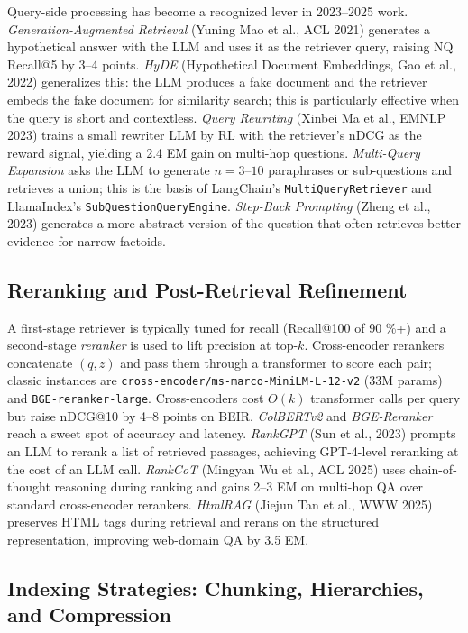 Query-side processing has become a recognized lever in 2023--2025 work. \emph{Generation-Augmented Retrieval} (Yuning Mao et al., ACL 2021) generates a hypothetical answer with the LLM and uses it as the retriever query, raising NQ Recall@5 by 3--4 points. \emph{HyDE} (Hypothetical Document Embeddings, Gao et al., 2022) generalizes this: the LLM produces a fake document and the retriever embeds the fake document for similarity search; this is particularly effective when the query is short and contextless. \emph{Query Rewriting} (Xinbei Ma et al., EMNLP 2023) trains a small rewriter LLM by RL with the retriever's nDCG as the reward signal, yielding a 2.4 EM gain on multi-hop questions. \emph{Multi-Query Expansion} asks the LLM to generate \(n=3\)--\(10\) paraphrases or sub-questions and retrieves a union; this is the basis of LangChain's \texttt{MultiQueryRetriever} and LlamaIndex's \texttt{SubQuestionQueryEngine}. \emph{Step-Back Prompting} (Zheng et al., 2023) generates a more abstract version of the question that often retrieves better evidence for narrow factoids.

\subsection{Reranking and Post-Retrieval Refinement}\label{reranking-and-post-retrieval-refinement}

A first-stage retriever is typically tuned for recall (Recall@100 of 90 \%+) and a second-stage \emph{reranker} is used to lift precision at top-\(k\). Cross-encoder rerankers concatenate \((q, z)\) and pass them through a transformer to score each pair; classic instances are \texttt{cross-encoder/ms-marco-MiniLM-L-12-v2} (33M params) and \texttt{BGE-reranker-large}. Cross-encoders cost \(O(k)\) transformer calls per query but raise nDCG@10 by 4--8 points on BEIR. \emph{ColBERTv2} and \emph{BGE-Reranker} reach a sweet spot of accuracy and latency. \emph{RankGPT} (Sun et al., 2023) prompts an LLM to rerank a list of retrieved passages, achieving GPT-4-level reranking at the cost of an LLM call. \emph{RankCoT} (Mingyan Wu et al., ACL 2025) uses chain-of-thought reasoning during ranking and gains 2--3 EM on multi-hop QA over standard cross-encoder rerankers. \emph{HtmlRAG} (Jiejun Tan et al., WWW 2025) preserves HTML tags during retrieval and rerans on the structured representation, improving web-domain QA by 3.5 EM.

\subsection{Indexing Strategies: Chunking, Hierarchies, and Compression}\label{indexing-strategies-chunking-hierarchies-and-compression}

